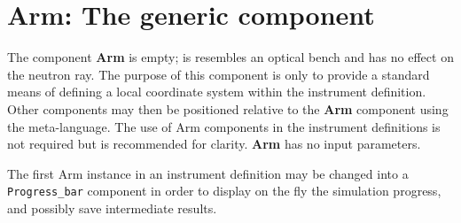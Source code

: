 \section{Arm: The generic component}
\label{explain:arm}

The component \textbf{Arm} is empty; is resembles an optical bench
and has no effect on the neutron ray.
The purpose of this component is only to provide a standard
means of defining a local coordinate system within the instrument definition.
Other components may then be
positioned relative to the \textbf{Arm} component
using the \MCS meta-language.
The use of \textrm{Arm} components in the instrument definitions
is not required but is recommended for clarity.
\textbf{Arm} has no input parameters.

The first Arm instance in an instrument definition may be changed into a \verb+Progress_bar+ component in order to display on the fly the simulation progress, and possibly save intermediate results.
